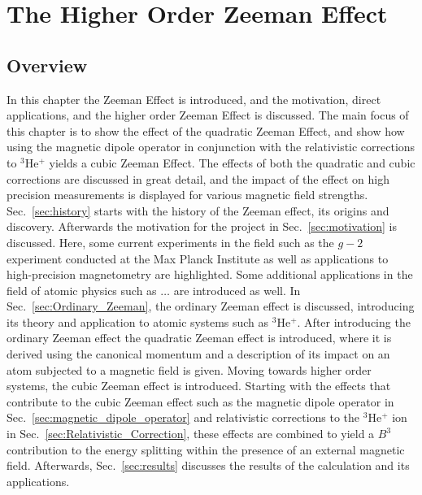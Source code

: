 
\chapter{The Higher Order Zeeman Effect}\label{sec:Zeeman-Effect}
    \section{Overview}
        In this chapter the Zeeman Effect is introduced, and the motivation, direct applications, and the higher order Zeeman Effect is discussed. The main focus of this chapter is to show the effect of the quadratic Zeeman Effect, and show how using the magnetic dipole operator in conjunction with the relativistic corrections to $^3$He$^+$ yields a cubic Zeeman Effect. The effects of both the quadratic and cubic corrections are discussed in great detail, and the impact of the effect on high precision measurements is displayed for various magnetic field strengths.\\

       Sec.~\ref{sec:history} starts with the history of the Zeeman effect, its origins and discovery. Afterwards the motivation for the project in Sec.~\ref{sec:motivation} is discussed. Here, some current experiments in the field such as the $g-2$ experiment conducted at the Max Planck Institute as well as applications to high-precision magnetometry are highlighted. Some additional applications in the field of atomic physics such as $\dots$ are introduced as well. In Sec.~\ref{sec:Ordinary_Zeeman}, the ordinary Zeeman effect is discussed, introducing its theory and application to atomic systems such as $^3$He$^+$. After introducing the ordinary Zeeman effect the quadratic Zeeman effect is introduced, where it is derived using the canonical momentum and a description of its impact on an atom subjected to a magnetic field is given. Moving towards higher order systems, the cubic Zeeman effect is introduced. Starting with the effects that contribute to the cubic Zeeman effect such as the magnetic dipole operator in Sec.~\ref{sec:magnetic_dipole_operator} and relativistic corrections to the $^3$He$^+$ ion in Sec.~\ref{sec:Relativistic_Correction}, these effects are combined to yield a $B^3$ contribution to the energy splitting within the presence of an external magnetic field. Afterwards, Sec.~\ref{sec:results} discusses the results of the calculation and its applications.


